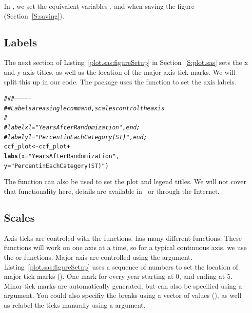 \documentclass[nojss, letterpaper]{jss}\usepackage[]{graphicx}\usepackage[]{color}
\makeatletter
\newcommand{\hlstr}[1]{\textcolor[rgb]{0.192,0.494,0.8}{#1}}%
\newcommand{\hlcom}[1]{\textcolor[rgb]{0.678,0.584,0.686}{\textit{#1}}}%
\newcommand{\hlopt}[1]{\textcolor[rgb]{0,0,0}{#1}}%
\newcommand{\hlstd}[1]{\textcolor[rgb]{0.345,0.345,0.345}{#1}}%
\newcommand{\hlkwb}[1]{\textcolor[rgb]{0.69,0.353,0.396}{#1}}%
\newcommand{\hlkwc}[1]{\textcolor[rgb]{0.333,0.667,0.333}{#1}}%
\newcommand{\hlkwd}[1]{\textcolor[rgb]{0.737,0.353,0.396}{\textbf{#1}}}%
\newenvironment{kframe}{%
 \def\at@end@of@kframe{}%
 \ifinner\ifhmode%
  \def\at@end@of@kframe{\end{minipage}}%
  \begin{minipage}{\columnwidth}%
 \fi\fi%
 \def\FrameCommand##1{\hskip\@totalleftmargin \hskip-\fboxsep
 \colorbox{shadecolor}{##1}\hskip-\fboxsep
     \hskip-\linewidth \hskip-\@totalleftmargin \hskip\columnwidth}%
 \MakeFramed {\advance\hsize-\width
   \@totalleftmargin\z@ \linewidth\hsize
   \@setminipage}}%
 {\par\unskip\endMakeFramed%
 \at@end@of@kframe}
\newenvironment{knitrout}{}{} %
\makeatother
\begin{document}
In , we set the equivalent variables ,  and  when saving the figure (Section~\ref{S:saving}).

\subsection{Labels}\label{S:labels}
The next section of Listing~\ref{plot.sas:figureSetup} in Section~\ref{S:plot.sas} sets the x and y axis titles, as well as the location of the major axis tick marks. We will split this up in our  code. The  package uses the  function to set the axis labels. 
\begin{knitrout}\footnotesize
{}\color{fgcolor}\begin{kframe}
\begin{alltt}
\hlcom{###-------------}
\hlcom{## Labels are a single command, scales control the axis}
\hlcom{#}
\hlcom{#    labelx l="Years After Randomization", end;}
\hlcom{#    labely l="Percent in Each Category (ST)", end;}
\hlstd{ccf_plot} \hlkwb{<-} \hlstd{ccf_plot} \hlopt{+}
  \hlkwd{labs}\hlstd{(}\hlkwc{x}\hlstd{=}\hlstr{"Years After Randomization"}\hlstd{,}
       \hlkwc{y}\hlstd{=}\hlstr{"Percent in Each Category (ST)"}\hlstd{)}
\end{alltt}
\end{kframe}
\end{knitrout}

The  function can also be used to set the plot  and legend titles. We will not cover that functionality here, details are available in~\cite{Wickham:2009} or through the Internet.

\subsection{Scales}\label{S:scales}
Axis ticks are controled with the  functions.  has many different  functions. These functions will work on one axis at a time, so for a typical continuous axis, we use the  or  functions. Major axis are controlled using the  argument. Listing~\ref{plot.sas:figureSetup} uses a sequence of numbers to set the location of major tick marks (). One mark for every year starting at 0, and ending at 5. Minor tick marks are automatically generated, but can also be specified using a  argument. You could also specifiy the breaks using a vector of values (), as well as relabel the ticks manually using a  argument.
\end{document}
